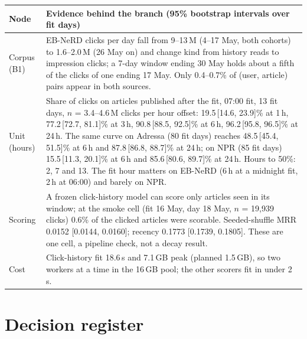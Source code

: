 \documentclass[9pt,a4paper]{article}
\begin{document}
\begin{center}
\scriptsize
\begin{tabularx}{\linewidth}{@{}p{1.3cm}X@{}}
\toprule
\textbf{Node} & \textbf{Evidence behind the branch (95\% bootstrap intervals over fit days)}\\
\midrule
Corpus (B1) & EB-NeRD clicks per day fall from 9--13\,M (4--17 May, both cohorts) to 1.6--2.0\,M (26 May on) and change kind from history reads to impression clicks; a 7-day window ending 30 May holds about a fifth of the clicks of one ending 17 May. Only 0.4--0.7\% of (user, article) pairs appear in both sources.\\
Unit (hours) & Share of clicks on articles published after the fit, 07:00 fit, 13 fit days, $n$ = 3.4--4.6\,M clicks per hour offset: 19.5\,[14.6, 23.9]\% at 1\,h, 77.2\,[72.7, 81.1]\% at 3\,h, 90.8\,[88.5, 92.5]\% at 6\,h, 96.2\,[95.8, 96.5]\% at 24\,h. The same curve on Adressa (80 fit days) reaches 48.5\,[45.4, 51.5]\% at 6\,h and 87.8\,[86.8, 88.7]\% at 24\,h; on NPR (85 fit days) 15.5\,[11.3, 20.1]\% at 6\,h and 85.6\,[80.6, 89.7]\% at 24\,h. Hours to 50\%: 2, 7 and 13. The fit hour matters on EB-NeRD (6\,h at a midnight fit, 2\,h at 06:00) and barely on NPR.\\
Scoring & A frozen click-history model can score only articles seen in its window; at the smoke cell (fit 16 May, day 18 May, $n$ = 19,939 clicks) 0.6\% of the clicked articles were scorable. Seeded-shuffle MRR 0.0152 [0.0144, 0.0160]; recency 0.1773 [0.1739, 0.1805]. These are one cell, a pipeline check, not a decay result.\\
Cost & Click-history fit 18.6\,s and 7.1\,GB peak (planned 1.5\,GB), so two workers at a time in the 16\,GB pool; the other scorers fit in under 2\,s.\\
\bottomrule
\end{tabularx}
\end{center}

\section{Decision register}
\end{document}
